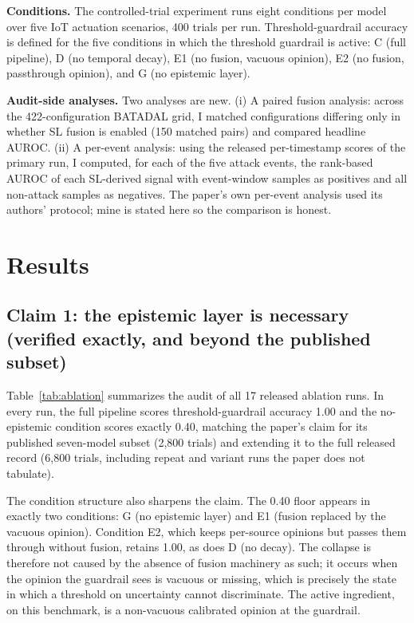 \documentclass[11pt]{article}
\begin{document}
\textbf{Conditions.} The controlled-trial experiment runs eight conditions per model over five IoT actuation scenarios, 400 trials per run. Threshold-guardrail accuracy is defined for the five conditions in which the threshold guardrail is active: C (full pipeline), D (no temporal decay), E1 (no fusion, vacuous opinion), E2 (no fusion, passthrough opinion), and G (no epistemic layer).

\textbf{Audit-side analyses.} Two analyses are new. (i) A paired fusion analysis: across the 422-configuration BATADAL grid, I matched configurations differing only in whether SL fusion is enabled (150 matched pairs) and compared headline AUROC. (ii) A per-event analysis: using the released per-timestamp scores of the primary run, I computed, for each of the five attack events, the rank-based AUROC of each SL-derived signal with event-window samples as positives and all non-attack samples as negatives. The paper's own per-event analysis used its authors' protocol; mine is stated here so the comparison is honest.

\section{Results}

\subsection{Claim 1: the epistemic layer is necessary (verified exactly, and beyond the published subset)}

Table~\ref{tab:ablation} summarizes the audit of all 17 released ablation runs. In every run, the full pipeline scores threshold-guardrail accuracy 1.00 and the no-epistemic condition scores exactly 0.40, matching the paper's claim for its published seven-model subset (2,800 trials) and extending it to the full released record (6,800 trials, including repeat and variant runs the paper does not tabulate).

The condition structure also sharpens the claim. The 0.40 floor appears in exactly two conditions: G (no epistemic layer) and E1 (fusion replaced by the vacuous opinion). Condition E2, which keeps per-source opinions but passes them through without fusion, retains 1.00, as does D (no decay). The collapse is therefore not caused by the absence of fusion machinery as such; it occurs when the opinion the guardrail sees is vacuous or missing, which is precisely the state in which a threshold on uncertainty cannot discriminate. The active ingredient, on this benchmark, is a non-vacuous calibrated opinion at the guardrail.
\end{document}

